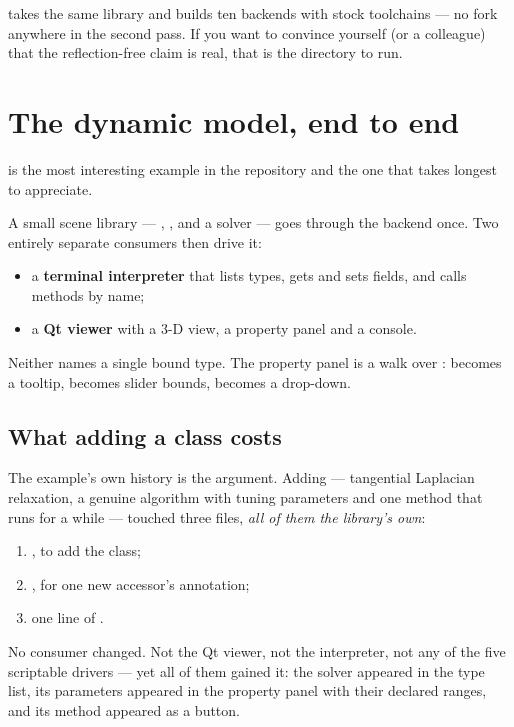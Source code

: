  takes the same library and builds ten backends
with stock toolchains --- no fork anywhere in the second pass. If you want to
convince yourself (or a colleague) that the reflection-free claim is real, that
is the directory to run.

\section{The dynamic model, end to end}

 is the most interesting example in the repository and
the one that takes longest to appreciate.

A small scene library --- , , and a  solver
--- goes through the  backend once. Two entirely separate
consumers then drive it:

\begin{itemize}
  \item a \textbf{terminal interpreter} that lists types, gets and sets fields,
    and calls methods by name;
  \item a \textbf{Qt viewer} with a 3-D view, a property panel and a console.
\end{itemize}

Neither names a single bound type. The property panel is a walk over
:  becomes a tooltip,  becomes slider
bounds,  becomes a drop-down.

\subsection*{What adding a class costs}

The example's own history is the argument. Adding  ---
tangential Laplacian relaxation, a genuine algorithm with tuning parameters and
one method that runs for a while --- touched three files, \emph{all of them the
library's own}:

\begin{enumerate}
  \item {}, to add the class;
  \item {}, for one new accessor's annotation;
  \item one line of .
\end{enumerate}

No consumer changed. Not the Qt viewer, not the interpreter, not any of the five
scriptable drivers --- yet all of them gained it: the solver appeared in the
type list, its parameters appeared in the property panel with their declared
ranges, and its method appeared as a button.

